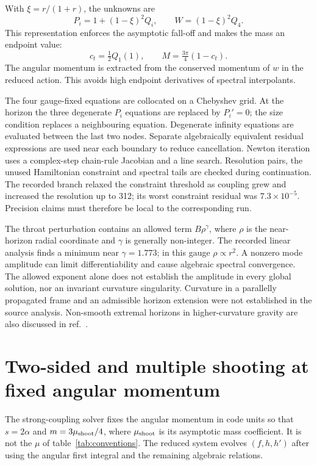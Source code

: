 \documentclass[11pt,a4paper]{article}
\begin{document}
With $\xi=r/(1+r)$, the unknowns are
\begin{equation}
 P_i=1+(1-\xi)^2Q_i,\qquad W=(1-\xi)^2Q_4.
\end{equation}
This representation enforces the asymptotic fall-off and makes the mass an endpoint value:
\begin{equation}
 c_t=\tfrac12Q_1(1),\qquad M=\tfrac{3\pi}{4}(1-c_t).
\end{equation}
The angular momentum is extracted from the conserved momentum of $w$ in the reduced action. This avoids high endpoint derivatives of spectral interpolants.

The four gauge-fixed equations are collocated on a Chebyshev grid. At the horizon the three degenerate $P_i$ equations are replaced by $P_i'=0$; the size condition replaces a neighbouring equation. Degenerate infinity equations are evaluated between the last two nodes. Separate algebraically equivalent residual expressions are used near each boundary to reduce cancellation. Newton iteration uses a complex-step chain-rule Jacobian and a line search. Resolution pairs, the unused Hamiltonian constraint and spectral tails are checked during continuation. The recorded branch relaxed the constraint threshold as coupling grew and increased the resolution up to 312; its worst constraint residual was $7.3\times10^{-5}$. Precision claims must therefore be local to the corresponding run.

The throat perturbation contains an allowed term $B\rho^\gamma$, where $\rho$ is the near-horizon radial coordinate and $\gamma$ is generally non-integer. The recorded linear analysis finds a minimum near $\gamma=1.773$; in this gauge $\rho\propto r^2$. A nonzero mode amplitude can limit differentiability and cause algebraic spectral convergence. The allowed exponent alone does not establish the amplitude in every global solution, nor an invariant curvature singularity. Curvature in a parallelly propagated frame and an admissible horizon extension were not established in the source analysis. Non-smooth extremal horizons in higher-curvature gravity are also discussed in ref.~\cite{Horowitz2023}.

\section{Two-sided and multiple shooting at fixed angular momentum}
\label{app:shoot}
The strong-coupling solver fixes the angular momentum in code units so that $s=2\alpha$ and $m=3\mu_{\rm shoot}/4$, where $\mu_{\rm shoot}$ is its asymptotic mass coefficient. It is not the $\mu$ of table~\ref{tab:conventions}. The reduced system evolves $(f,h,h')$ after using the angular first integral and the remaining algebraic relations.
\end{document}
